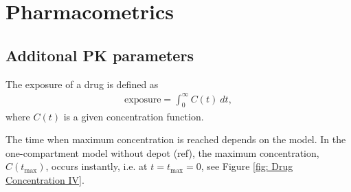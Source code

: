 \chapter{Pharmacometrics}
\section{Additonal PK parameters}
\label{app: add. PK parameters}
The exposure of a drug is defined as
\begin{align*}
    \text{exposure} = \int_0^{\infty} C(t) \ dt,
\end{align*}
where $C(t)$ is a given concentration function.

The time when maximum concentration is reached depends on the model. In the one-compartment model without depot (ref), the maximum concentration, $C(t_{\text{max}})$, occurs instantly, i.e. at $t = t_{\text{max}} = 0$, see Figure \ref{fig: Drug Concentration IV}.


